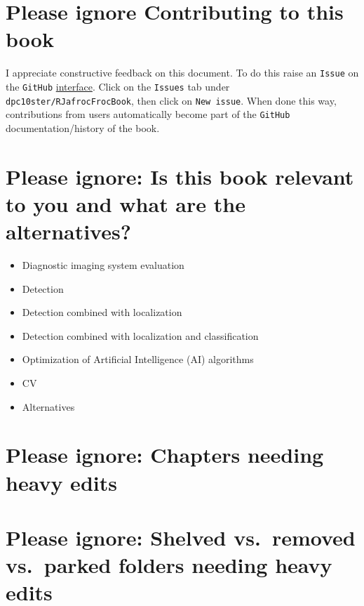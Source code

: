 \documentclass[
]{book}
\providecommand{\tightlist}{%
  \setlength{\itemsep}{0pt}\setlength{\parskip}{0pt}}
\begin{document}
\hypertarget{please-ignore-contributing-to-this-book}{%
\section*{Please ignore Contributing to this book}\label{please-ignore-contributing-to-this-book}}

I appreciate constructive feedback on this document. To do this raise an \texttt{Issue} on the \texttt{GitHub} \href{https://github.com/dpc10ster/RJafrocFrocBook}{interface}. Click on the \texttt{Issues} tab under \texttt{dpc10ster/RJafrocFrocBook}, then click on \texttt{New\ issue}. When done this way, contributions from users automatically become part of the \texttt{GitHub} documentation/history of the book.

\hypertarget{please-ignore-is-this-book-relevant-to-you-and-what-are-the-alternatives}{%
\section*{Please ignore: Is this book relevant to you and what are the alternatives?}\label{please-ignore-is-this-book-relevant-to-you-and-what-are-the-alternatives}}

\begin{itemize}
\tightlist
\item
  Diagnostic imaging system evaluation
\item
  Detection
\item
  Detection combined with localization
\item
  Detection combined with localization and classification
\item
  Optimization of Artificial Intelligence (AI) algorithms
\item
  CV
\item
  Alternatives
\end{itemize}

\hypertarget{please-ignore-chapters-needing-heavy-edits}{%
\section*{Please ignore: Chapters needing heavy edits}\label{please-ignore-chapters-needing-heavy-edits}}

\hypertarget{please-ignore-shelved-vs.-removed-vs.-parked-folders-needing-heavy-edits}{%
\section*{Please ignore: Shelved vs.~removed vs.~parked folders needing heavy edits}\label{please-ignore-shelved-vs.-removed-vs.-parked-folders-needing-heavy-edits}}
\end{document}
